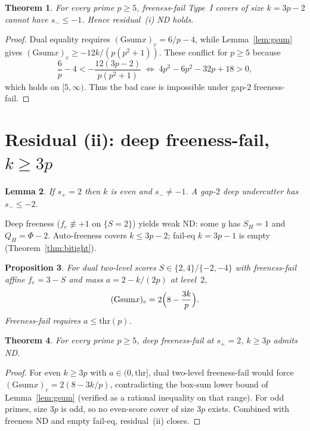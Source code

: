 \documentclass[10pt]{article}
\theoremstyle{plain}
\newtheorem{theorem}{Theorem}
\newtheorem{lemma}[theorem]{Lemma}
\newtheorem{proposition}[theorem]{Proposition}
\theoremstyle{remark}
\newcommand{\Gsum}{\mathrm{Gsum}}
\newcommand{\thr}{\mathrm{thr}}
\begin{document}
\begin{theorem}
\label{thm:res-i}
For every prime $p\ge5$, freeness-fail Type~I covers of size $k=3p-2$ cannot have
$s_-\le-1$. Hence residual~(i) ND holds.
\end{theorem}

\begin{proof}
Dual equality requires $(\Gsum x)_e=6/p-4$, while Lemma~\ref{lem:gsum} gives
$(\Gsum x)_e\ge-12k/(p(p^2+1))$. These conflict for $p\ge5$ because
\begin{equation}
\label{eq:farkas-i}
\frac6p-4<-\frac{12(3p-2)}{p(p^2+1)}
\;\Longleftrightarrow\;
4p^3-6p^2-32p+18>0,
\end{equation}
which holds on $[5,\infty)$. Thus the bad case is impossible under gap-$2$ freeness-fail.
\end{proof}

\section{Residual (ii): deep freeness-fail, $k\ge3p$}

\begin{lemma}
If $s_+=2$ then $k$ is even and $s_-\neq-1$. A gap-$2$ deep undercutter has $s_-\le-2$.
\end{lemma}

Deep freeness ($f_e\not\equiv+1$ on $\{S=2\}$) yields weak ND: some $y$ has $S_H=1$ and
$Q_H=\Phi-2$. Auto-freeness covers $k\le3p-2$; fail-eq $k=3p-1$ is empty
(Theorem~\ref{thm:bitight}).

\begin{proposition}
For dual two-level scores $S\in\{2,4\}/\{-2,-4\}$ with freeness-fail affine $f_e=3-S$
and mass $a=2-k/(2p)$ at level~$2$,
\[
(\Gsum x)_e=2\Bigl(8-\frac{3k}{p}\Bigr).
\]
Freeness-fail requires $a\le\thr(p)$.
\end{proposition}

\begin{theorem}
\label{thm:res-ii}
For every prime $p\ge5$, deep freeness-fail at $s_+=2$, $k\ge3p$ admits ND.
\end{theorem}

\begin{proof}
For even $k\ge3p$ with $a\in(0,\thr]$, dual two-level freeness-fail would force
$(\Gsum x)_e=2(8-3k/p)$, contradicting the box-sum lower bound of Lemma~\ref{lem:gsum}
(verified as a rational inequality on that range). For odd primes, size $3p$ is odd,
so no even-score cover of size $3p$ exists. Combined with freeness ND and empty fail-eq,
residual~(ii) closes.
\end{proof}
\end{document}
